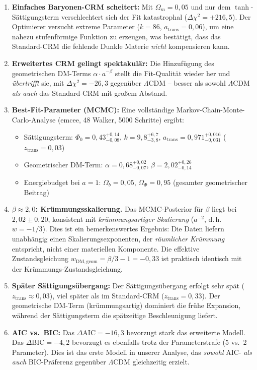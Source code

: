 \documentclass[aps,prd,twocolumn,superscriptaddress,nofootinbib]{revtex4-2}
\begin{document}
\begin{enumerate}
\item \textbf{Einfaches Baryonen-CRM scheitert:} Mit $\Omega_m = 0{,}05$ und nur dem $\tanh$-S\"attigungsterm verschlechtert sich der Fit katastrophal ($\Delta\chi^2 = +216{,}5$). Der Optimierer versucht extreme Parameter ($k = 86$, $a_{\mathrm{trans}} = 0{,}06$), um eine nahezu stufenf\"ormige Funktion zu erzeugen, was best\"atigt, dass das Standard-CRM die fehlende Dunkle Materie \textit{nicht} kompensieren kann.

\item \textbf{Erweitertes CRM gelingt spektakul\"ar:} Die Hinzuf\"ugung des geometrischen DM-Terms $\alpha \cdot a^{-\beta}$ stellt die Fit-Qualit\"at wieder her und \textit{\"ubertrifft} sie, mit $\Delta\chi^2 = -26{,}3$ gegen\"uber $\Lambda$CDM -- besser als sowohl $\Lambda$CDM \textit{als auch} das Standard-CRM mit großem Abstand.

\item \textbf{Best-Fit-Parameter (MCMC):} Eine vollst\"andige Markov-Chain-Monte-Carlo-Analyse (emcee, 48 Walker, 5000 Schritte) ergibt:
\begin{itemize}
\item S\"attigungsterm: $\Phi_0 = 0{,}43^{+0{,}14}_{-0{,}08}$, $k = 9{,}8^{+6{,}7}_{-3{,}8}$, $a_{\mathrm{trans}} = 0{,}971^{+0{,}016}_{-0{,}031}$ ($z_{\mathrm{trans}} = 0{,}03$)
\item Geometrischer DM-Term: $\alpha = 0{,}68^{+0{,}02}_{-0{,}07}$, $\beta = 2{,}02^{+0{,}26}_{-0{,}14}$
\item Energiebudget bei $a = 1$: $\Omega_b = 0{,}05$, $\Omega_\Phi = 0{,}95$ (gesamter geometrischer Beitrag)
\end{itemize}

\item \textbf{$\beta \approx 2{,}0$: Kr\"ummungsskalierung.} Das MCMC-Posterior f\"ur $\beta$ liegt bei $2{,}02 \pm 0{,}20$, konsistent mit \textit{kr\"ummungsartiger Skalierung} ($a^{-2}$, d.\,h.\ $w = -1/3$). Dies ist ein bemerkenswertes Ergebnis: Die Daten liefern unabh\"angig einen Skalierungsexponenten, der \textit{r\"aumlicher Kr\"ummung} entspricht, nicht einer materiellen Komponente. Die effektive Zustandsgleichung $w_{\mathrm{DM,geom}} = \beta/3 - 1 = -0{,}33$ ist praktisch identisch mit der Kr\"ummungs-Zustandsgleichung.

\item \textbf{Sp\"ater S\"attigungs\"ubergang:} Der S\"attigungs\"ubergang erfolgt sehr sp\"at ($z_{\mathrm{trans}} \approx 0{,}03$), viel sp\"ater als im Standard-CRM ($z_{\mathrm{trans}} = 0{,}33$). Der geometrische DM-Term (kr\"ummungsartig) dominiert die fr\"uhe Expansion, w\"ahrend der S\"attigungsterm die sp\"atzeitige Beschleunigung liefert.

\item \textbf{AIC vs.\ BIC:} Das $\Delta\mathrm{AIC} = -16{,}3$ bevorzugt stark das erweiterte Modell. Das $\Delta\mathrm{BIC} = -4{,}2$ bevorzugt es ebenfalls trotz der Parameterstrafe (5 vs.\ 2 Parameter). Dies ist das erste Modell in unserer Analyse, das \textit{sowohl} AIC- \textit{als auch} BIC-Pr\"aferenz gegen\"uber $\Lambda$CDM gleichzeitig erzielt.
\end{enumerate}
\end{document}
